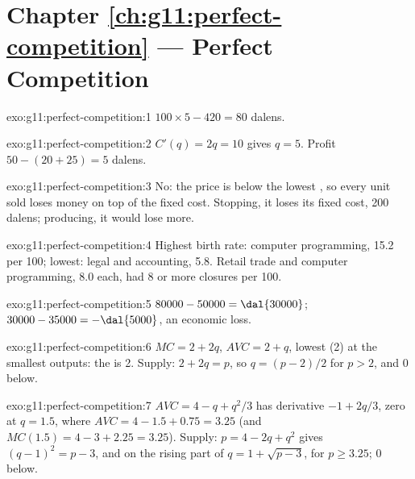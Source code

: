 \section*{Chapter \ref{ch:g11:perfect-competition} --- Perfect Competition}

\begin{solution}{exo:g11:perfect-competition:1}
$100 \times 5 - 420 = 80$ dalens.
\end{solution}

\begin{solution}{exo:g11:perfect-competition:2}
$C'(q) = 2q = 10$ gives $q = 5$. Profit $50 - (20 + 25) = 5$ dalens.
\end{solution}

\begin{solution}{exo:g11:perfect-competition:3}
No: the price is below the lowest , so every unit sold loses money on top of the fixed cost. Stopping, it loses its fixed cost, 200 dalens;
producing, it would lose more.
\end{solution}

\begin{solution}{exo:g11:perfect-competition:4}
Highest birth rate: computer programming, 15.2 per 100; lowest: legal and accounting, 5.8. Retail trade and computer programming, 8.0 each, had 8 or more closures per
100.
\end{solution}

\begin{solution}{exo:g11:perfect-competition:5}
 $80000 - 50000 = \dal{30000}$;  $30000 - 35000 = -\dal{5000}$, an economic loss.
\end{solution}

\begin{solution}{exo:g11:perfect-competition:6}
$\mathit{MC} = 2 + 2q$, $\mathit{AVC} = 2 + q$, lowest (2) at the smallest outputs: the  is 2. Supply: $2 + 2q = p$, so $q = (p - 2)/2$ for $p > 2$, and 0
below.
\end{solution}

\begin{solution}{exo:g11:perfect-competition:7}
$\mathit{AVC} = 4 - q + q^2/3$ has derivative $-1 + 2q/3$, zero at $q = 1.5$, where $\mathit{AVC} = 4 - 1.5 + 0.75 = 3.25$ (and $\mathit{MC}(1.5) = 4 - 3 + 2.25 = 3.25$).
Supply: $p = 4 - 2q + q^2$ gives $(q - 1)^2 = p - 3$, and on the rising part of  $q = 1 + \sqrt{p - 3}$, for $p \geq 3.25$; 0 below.
\end{solution}

